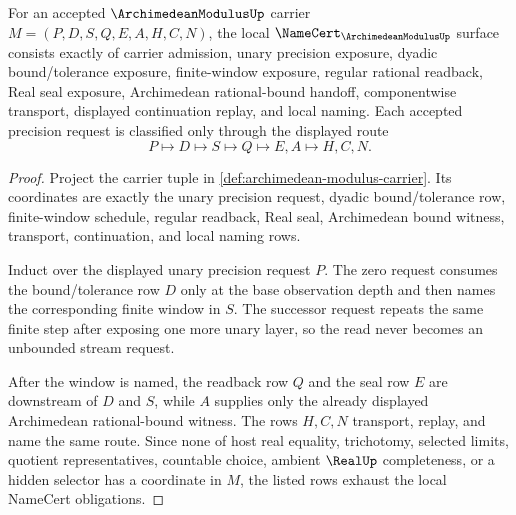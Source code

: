 \begin{theorem}
\label{thm:archimedean-modulus-namecert-obligations}
For an accepted $\ArchimedeanModulusUp$ carrier $M=(P,D,S,Q,E,A,H,C,N)$, the local $\NameCert_{\ArchimedeanModulusUp}$ surface consists exactly of carrier admission, unary precision exposure, dyadic bound/tolerance exposure, finite-window exposure, regular rational readback, Real seal exposure, Archimedean rational-bound handoff, componentwise transport, displayed continuation replay, and local naming. Each accepted precision request is classified only through the displayed route
$$
P \longmapsto D \longmapsto S \longmapsto Q \longmapsto E,A \longmapsto H,C,N .
$$
\end{theorem}
\begin{proof}
Project the carrier tuple in \autoref{def:archimedean-modulus-carrier}. Its coordinates are exactly the unary precision request, dyadic bound/tolerance row, finite-window schedule, regular readback, Real seal, Archimedean bound witness, transport, continuation, and local naming rows.

Induct over the displayed unary precision request $P$. The zero request consumes the bound/tolerance row $D$ only at the base observation depth and then names the corresponding finite window in $S$. The successor request repeats the same finite step after exposing one more unary layer, so the read never becomes an unbounded stream request.

After the window is named, the readback row $Q$ and the seal row $E$ are downstream of $D$ and $S$, while $A$ supplies only the already displayed Archimedean rational-bound witness. The rows $H,C,N$ transport, replay, and name the same route. Since none of host real equality, trichotomy, selected limits, quotient representatives, countable choice, ambient $\RealUp$ completeness, or a hidden selector has a coordinate in $M$, the listed rows exhaust the local NameCert obligations.
\end{proof}

